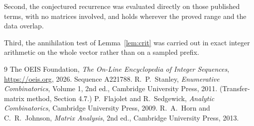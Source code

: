 \documentclass[11pt,a4paper]{article}
\theoremstyle{plain}
\theoremstyle{definition}
\begin{document}
Second, the conjectured recurrence was evaluated directly on those published terms, with no
matrices involved, and holds wherever the proved range and the data overlap.

Third, the annihilation test of Lemma~\ref{lem:crit} was carried out in exact integer
arithmetic on the whole vector rather than on a sampled prefix.

\begin{thebibliography}{9}
 The OEIS Foundation, \emph{The On-Line Encyclopedia of Integer
Sequences}, \url{https://oeis.org}, 2026. Sequence A221788.
 R.~P.~Stanley, \emph{Enumerative Combinatorics}, Volume 1, 2nd ed.,
Cambridge University Press, 2011. (Transfer-matrix method, Section 4.7.)
 P.~Flajolet and R.~Sedgewick, \emph{Analytic Combinatorics}, Cambridge
University Press, 2009.
 R.~A.~Horn and C.~R.~Johnson, \emph{Matrix Analysis}, 2nd ed., Cambridge
University Press, 2013.
\end{thebibliography}
\end{document}
